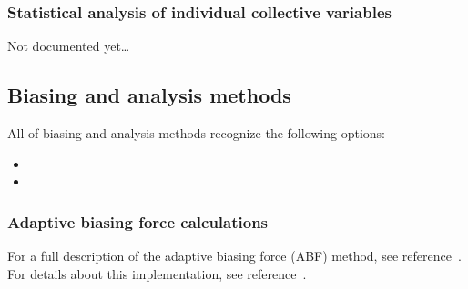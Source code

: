 \begin{itemize}

\end{itemize}



\subsubsection{Statistical analysis of individual collective variables}
\label{sec:colvar_acf}

Not documented yet\ldots


\subsection{Biasing and analysis methods}
\label{sec:colvarbias}

All of biasing and analysis methods recognize the following
options:
\begin{itemize}
\item %
\item %
\end{itemize}


\subsubsection{Adaptive biasing force calculations}
\label{sec:colvarbias_abf}

For a full description of the adaptive biasing force (ABF) method, see
reference~\cite{Darve2008}. For details about this implementation,
see reference~\cite{Henin2004}.

